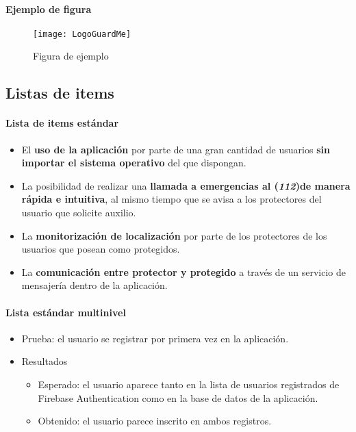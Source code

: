 \paragraph*{Ejemplo de figura}

\begin{figure}[H]
     \centering
     \texttt{[image: LogoGuardMe]}
     \caption{Figura de ejemplo}
     \label{fig1}
\end{figure}

\subsection*{Listas de items}

\paragraph*{Lista de items estándar}
 
\renewcommand{\labelitemi}{$-$}
\begin{itemize}
  \item El \textbf{uso de la aplicación} por parte de una gran cantidad de usuarios \textbf{sin importar el sistema operativo} del que dispongan.
  \item La posibilidad de realizar una \textbf{llamada a emergencias al (\textit{112})de manera rápida e intuitiva}, al mismo tiempo que se avisa a los protectores del usuario que solicite auxilio.
  \item La \textbf{monitorización de localización} por parte de los protectores de los usuarios que posean como protegidos.
  \item La \textbf{comunicación entre protector y protegido} a través de un servicio de mensajería dentro de la aplicación.
\end{itemize}

\paragraph*{Lista estándar multinivel}

\begin{itemize}
	\item Prueba: el usuario se registrar por primera vez en la aplicación.
	\item Resultados
	\begin{itemize}
		\item Esperado: el usuario aparece tanto en la lista de usuarios registrados de Firebase Authentication como en la base de datos de la aplicación.
		\item Obtenido: el usuario parece inscrito en ambos registros.
	\end{itemize}
\end{itemize}


